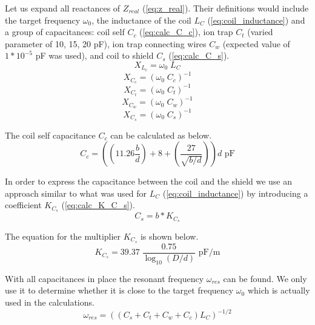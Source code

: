 Let us expand all reactances of $Z_{real}$ (\ref{eq:z_real}). Their definitions would include the target frequency $\omega_0$, the inductance of the coil $L_C$ (\ref{eq:coil_inductance}) and a group of capacitances: coil self $C_c$ (\ref{eq:calc_C_c}), ion trap $C_t$ (varied parameter of 10, 15, 20 pF), ion trap connecting wires $C_w$ (expected value of $1*10^{-5}$ pF was used), and coil to shield $C_s$ (\ref{eq:calc_C_s}).
\begin{equation}
	X_{L_c} = \omega_0 \; L_C
	\label{eq:calc_X_L_c}
\end{equation}
\begin{equation}
	X_{C_c} = \left( \omega_0 \; C_c \right)^{-1}
	\label{eq:calc_X_C_c}
\end{equation}
\begin{equation}
	X_{C_t} = \left( \omega_0 \; C_t \right)^{-1}
	\label{eq:calc_X_C_t}
\end{equation}
\begin{equation}
	X_{C_w} = \left( \omega_0 \; C_w \right)^{-1}
	\label{eq:calc_X_C_w}
\end{equation}
\begin{equation}
	X_{C_s} = \left( \omega_0 \; C_s \right)^{-1}
	\label{eq:calc_X_C_s}
\end{equation}

The coil self capacitance $C_c$ can be calculated as below.
\begin{equation}
	C_c = \left( \left( 11.26 \frac{b}{d} \right) + 8 + \left( \frac{27}{\sqrt{b/d}} \right) \right) d \text{ pF}
	\label{eq:calc_C_c}
\end{equation}

In order to express the capacitance between the coil and the shield we use an approach similar to what was used for $L_C$ (\ref{eq:coil_inductance}) by introducing a coefficient $K_{C_s}$ (\ref{eq:calc_K_C_s}).
\begin{equation}
	C_s = b* K_{C_s}
	\label{eq:calc_C_s}
\end{equation}

The equation for the multiplier $K_{C_s}$ is shown below.
\begin{equation}
	K_{C_s} = 39.37 \; \frac{0.75}{\log_{10}{(D/d)}} \text{ pF/m}
	\label{eq:calc_K_C_s}
\end{equation}

With all capacitances in place the resonant frequency $\omega_{res}$ can be found. We only use it to determine whether it is close to the target frequency $\omega_0$ which is actually used in the calculations.
\begin{equation}
	\omega_{res} = \left( \left( C_s + C_t + C_w + C_c \right) L_C \right)^{-1/2}
\end{equation}

